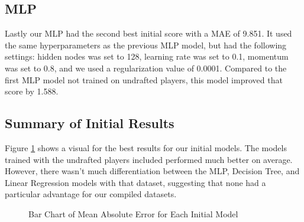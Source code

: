 \documentclass{article}
\begin{document}
\subsection{MLP}

Lastly our MLP had the second best initial score with a MAE of 9.851. It used
the same hyperparameters as the previous MLP model, but had the following
settings: hidden nodes was set to 128, learning rate was set to 0.1, momentum
was set to 0.8, and we used a regularization value of 0.0001. Compared to the
first MLP model not trained on undrafted players, this model improved that score
by 1.588.

\subsection{Summary of Initial Results}

Figure \ref{fig:initial_results} shows a visual for the best results for our
initial models. The models trained with the undrafted players included performed
much better on average. However, there wasn't much differentiation between the
MLP, Decision Tree, and Linear Regression models with that dataset, suggesting
that none had a particular advantage for our compiled datasets.

\begin{figure}
	\begin{center}
    \caption{Bar Chart of Mean Absolute Error for Each Initial Model}
    \label{fig:initial_results}
	\end{center}
\end{figure}
\end{document}
